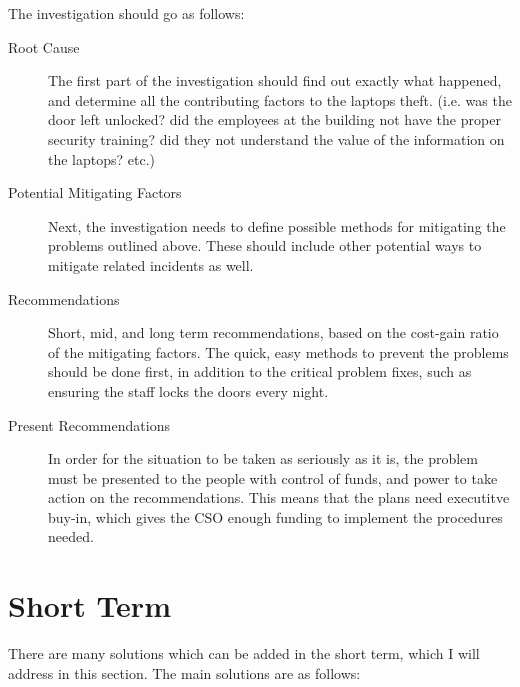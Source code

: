 \documentclass{article}
\numberwithin{equation}{section} %
\numberwithin{figure}{section} %
\numberwithin{table}{section} %
\begin{document}
The investigation should go as follows: 
\begin{description}
	\item[Root Cause]  The first part of the investigation should find out exactly what happened, and determine all the contributing factors to the laptops theft.  (i.e. was the door left unlocked? did the employees at the building not have the proper security training?  did they not understand the value of the information on the laptops? etc.)
	\item[Potential Mitigating Factors]  Next, the investigation needs to define possible methods for mitigating the problems outlined above.  These should include other potential ways to mitigate related incidents as well.  
	\item[Recommendations]  Short, mid, and long term recommendations, based on the cost-gain ratio of the mitigating factors.   The quick, easy methods to prevent the problems should be done first, in addition to the critical problem fixes, such as ensuring the staff locks the doors every night.
	\item[Present Recommendations]  In order for the situation to be taken as seriously as it is, the problem must be presented to the people with control of funds, and power to take action on the recommendations.  This means that the plans need executitve buy-in, which gives the CSO enough funding to implement the procedures needed.
\end{description}

\section{Short Term}
\label{sec:short}
There are many solutions which can be added in the short term, which I will address in this section.  The main solutions are as follows: 
\end{document}
